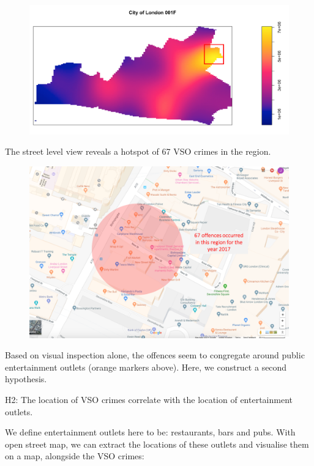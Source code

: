 \documentclass[]{article}
\theoremstyle{definition}
\theoremstyle{definition}
\theoremstyle{definition}
\theoremstyle{remark}
\begin{document}
\begin{figure}
\centering
\includegraphics{pictures/COL001F_Hotspot_box.png}
\caption{}
\end{figure}

The street level view reveals a hotspot of 67 VSO crimes in the region.

\begin{figure}
\centering
\includegraphics{pictures/COL001F_Hotspot.png}
\caption{}
\end{figure}

Based on visual inspection alone, the offences seem to congregate around
public entertainment outlets (orange markers above). Here, we construct
a second hypothesis.

H2: The location of VSO crimes correlate with the location of
entertainment outlets.

We define entertainment outlets here to be: restaurants, bars and pubs.
With open street map, we can extract the locations of these outlets and
visualise them on a map, alongside the VSO crimes:
\end{document}
